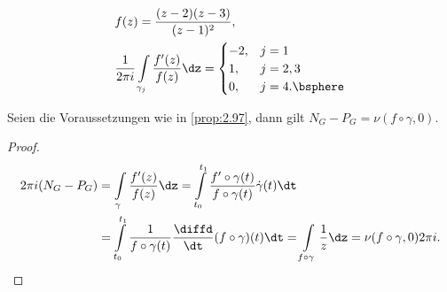\begin{bsp}
\label{bsp:2.98}
\begin{align*}
&f(z) = \frac{(z-2)(z-3)}{(z-1)^2},\\
&\frac{1}{2\pi i}\int\limits_{\gamma_j} \frac{f'(z)}{f(z)}\dz = \begin{cases}
                                                               -2,& j=1\\
                                                               1, & j=2,3\\
                                                               0, & j=4.\bsphere
                                                               \end{cases}
\end{align*}
\end{bsp}

\begin{prop}
\label{prop:2.99}
Seien die Voraussetzungen wie in \ref{prop:2.97}, dann gilt $N_G-P_G =
\nu(f\circ\gamma,0)$.\fishhere
\end{prop}
\begin{proof}
\begin{align*}
2\pi i(N_G-P_G) &= \int\limits_{\gamma} \frac{f'(z)}{f(z)}\dz =
\int\limits_{t_0}^{t_1}
\frac{f'\circ\gamma(t)}{f\circ\gamma(t)}\dot{\gamma}(t)\dt
\\ &= \int\limits_{t_0}^{t_1}
\frac{1}{f\circ\gamma(t)}\frac{\diffd}{\dt}(f\circ\gamma)(t) \dt
= \int\limits_{f\circ\gamma} \frac{1}{z}\dz = \nu(f\circ\gamma,0)2\pi i.\qedhere 
\end{align*}
\end{proof}

